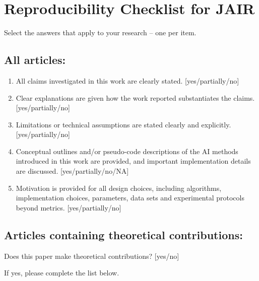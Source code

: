 \section{Reproducibility Checklist for JAIR}

Select the answers that apply to your research -- one per item. 

\subsection*{All articles:}

\begin{enumerate}
    \item All claims investigated in this work are clearly stated. 
    [yes/partially/no]
    \item Clear explanations are given how the work reported substantiates the claims. 
    [yes/partially/no]
    \item Limitations or technical assumptions are stated clearly and explicitly. 
    [yes/partially/no]
    \item Conceptual outlines and/or pseudo-code descriptions of the AI methods introduced in this work are provided, and important implementation details are discussed. 
    [yes/partially/no/NA]
    \item 
    Motivation is provided for all design choices, including algorithms, implementation choices, parameters, data sets and experimental protocols beyond metrics.
    [yes/partially/no]
\end{enumerate}

\subsection*{Articles containing theoretical contributions:}
Does this paper make theoretical contributions? 
[yes/no] 

If yes, please complete the list below.

